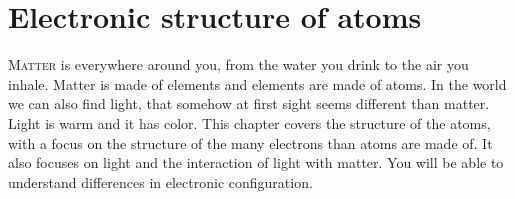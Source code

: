 \documentclass[main.tex]{subfiles}
\begin{document}
\linenumbers

  

\chapter[Electronic structure of atoms]{Electronic structure of atoms}


   
         \begin{marginfigure}
\end{marginfigure}


\lettrine[lines=4]{\color{black!45}M}{atter} is everywhere around you, from the water you drink to the air you inhale. Matter is made of elements and elements are made of atoms. In the world we can also find light, that somehow at first sight seems different than matter. Light is warm and it has color. This chapter covers the structure of the atoms, with a focus on the structure of the many electrons than atoms are made of. It also focuses on light and the interaction of light with matter. You will be able to understand differences in electronic configuration.
 
\end{document}
